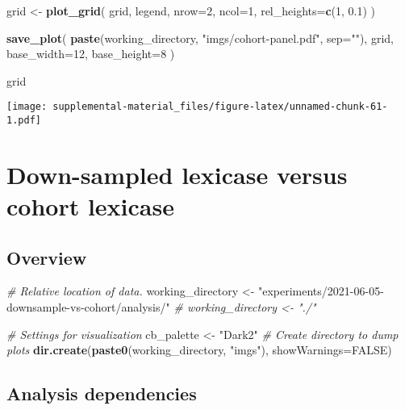 \documentclass[]{book}
\newenvironment{Shaded}{\begin{snugshade}}{\end{snugshade}}
\newcommand{\CommentTok}[1]{\textcolor[rgb]{0.56,0.35,0.01}{\textit{#1}}}
\newcommand{\DataTypeTok}[1]{\textcolor[rgb]{0.13,0.29,0.53}{#1}}
\newcommand{\DecValTok}[1]{\textcolor[rgb]{0.00,0.00,0.81}{#1}}
\newcommand{\FloatTok}[1]{\textcolor[rgb]{0.00,0.00,0.81}{#1}}
\newcommand{\KeywordTok}[1]{\textcolor[rgb]{0.13,0.29,0.53}{\textbf{#1}}}
\newcommand{\NormalTok}[1]{#1}
\newcommand{\OtherTok}[1]{\textcolor[rgb]{0.56,0.35,0.01}{#1}}
\newcommand{\StringTok}[1]{\textcolor[rgb]{0.31,0.60,0.02}{#1}}
\begin{document}
\begin{Shaded}
\begin{Highlighting}[]
\NormalTok{grid <-}\StringTok{ }\KeywordTok{plot_grid}\NormalTok{(}
\NormalTok{  grid,}
\NormalTok{  legend,}
  \DataTypeTok{nrow=}\DecValTok{2}\NormalTok{,}
  \DataTypeTok{ncol=}\DecValTok{1}\NormalTok{,}
  \DataTypeTok{rel_heights=}\KeywordTok{c}\NormalTok{(}\DecValTok{1}\NormalTok{, }\FloatTok{0.1}\NormalTok{)}
\NormalTok{)}

\KeywordTok{save_plot}\NormalTok{(}
  \KeywordTok{paste}\NormalTok{(working_directory, }\StringTok{"imgs/cohort-panel.pdf"}\NormalTok{, }\DataTypeTok{sep=}\StringTok{""}\NormalTok{),}
\NormalTok{  grid,}
  \DataTypeTok{base_width=}\DecValTok{12}\NormalTok{,}
  \DataTypeTok{base_height=}\DecValTok{8}
\NormalTok{)}

\NormalTok{grid}
\end{Highlighting}
\end{Shaded}

\texttt{[image: supplemental-material\_files/figure-latex/unnamed-chunk-61-1.pdf]}

\hypertarget{down-sampled-lexicase-versus-cohort-lexicase}{%
\chapter{Down-sampled lexicase versus cohort lexicase}\label{down-sampled-lexicase-versus-cohort-lexicase}}

\hypertarget{overview-6}{%
\section{Overview}\label{overview-6}}

\begin{Shaded}
\begin{Highlighting}[]
\CommentTok{# Relative location of data.}
\NormalTok{working_directory <-}
\StringTok{  "experiments/2021-06-05-downsample-vs-cohort/analysis/"}
\CommentTok{# working_directory <- "./"}

\CommentTok{# Settings for visualization}
\NormalTok{cb_palette <-}\StringTok{ "Dark2"}
\CommentTok{# Create directory to dump plots}
\KeywordTok{dir.create}\NormalTok{(}\KeywordTok{paste0}\NormalTok{(working_directory, }\StringTok{"imgs"}\NormalTok{), }\DataTypeTok{showWarnings=}\OtherTok{FALSE}\NormalTok{)}
\end{Highlighting}
\end{Shaded}

\hypertarget{analysis-dependencies-6}{%
\section{Analysis dependencies}\label{analysis-dependencies-6}}
\end{document}
